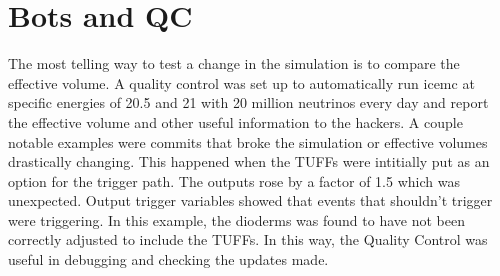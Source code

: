 \documentclass[12pt]{article}
\theoremstyle{plain}
\theoremstyle{definition}
\begin{document}
\section{Bots and QC}
\hspace{0.20in}
The most telling way to test a change in the simulation is to compare the effective volume. A quality control was set up to automatically run icemc at specific energies of 20.5 and 21 with 20 million neutrinos every day and report the effective volume and other useful information to the hackers. A couple notable examples were commits that broke the simulation or effective volumes drastically changing. This happened when the TUFFs were intitially put as an option for the trigger path. The outputs rose by a factor of 1.5 which was unexpected. Output trigger variables showed that events that shouldn't trigger were triggering. In this example, the dioderms was found to have not been correctly adjusted to include the TUFFs. In this way, the Quality Control was useful in debugging and checking the updates made. 
\end{document}
